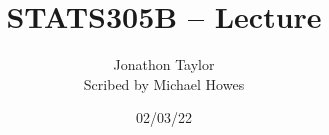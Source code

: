 




\title{STATS305B -- Lecture }
\author{Jonathon Taylor\\ Scribed by Michael Howes}
\date{02/03/22}

\pagestyle{fancy}
\fancyhf{}


\maketitle
\tableofcontents
